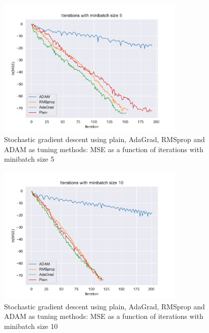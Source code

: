 \begin{figure}[H]
\centering
\includegraphics[width=0.8\textwidth]{Figures/PartA/minibatch_5_MSE(iter).pdf}
\caption{Stochastic gradient descent using plain, AdaGrad, RMSprop and ADAM as tuning methods: MSE as a function of iterations with minibatch size 5}
\label{fig:minibatch_5_MSE-iter-pdf}
\end{figure}

\begin{figure}[H]
\centering
\includegraphics[width=0.8\textwidth]{Figures/PartA/minibatch_10_MSE(iter).pdf}
\caption{Stochastic gradient descent using plain, AdaGrad, RMSprop and ADAM as tuning methods: MSE as a function of iterations with minibatch size 10}
\label{fig:minibatch_10_MSE-iter-pdf}
\end{figure}

